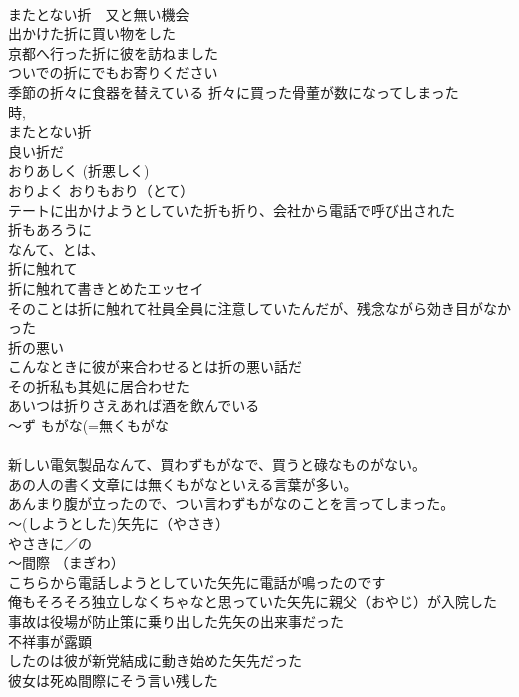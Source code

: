 \documentclass[8pt]{extreport}
\begin{document}
\begin{CJK}{UTF8}{min}
\\	またとない折　又と無い機会	
\\	出かけた折に買い物をした 
\\	京都へ行った折に彼を訪ねました 
\\	ついでの折にでもお寄りください 
\\	季節の折々に食器を替えている 折々に買った骨董が数になってしまった	
\\	時, 
\\	またとない折 
\\	良い折だ 
\\	おりあしく (折悪しく) 
\\	おりよく おりもおり（とて） 
\\	テートに出かけようとしていた折も折り、会社から電話で呼び出された 
\\	折もあろうに 
\\	なんて、とは、
\\	折に触れて 
\\	折に触れて書きとめたエッセイ 
\\	そのことは折に触れて社員全員に注意していたんだが、残念ながら効き目がなかった 
\\	折の悪い 
\\	こんなときに彼が来合わせるとは折の悪い話だ 
\\	その折私も其処に居合わせた 
\\	あいつは折りさえあれば酒を飲んでいる 
\\	～ず もがな(=無くもがな 
\\	[ずもがな] 
\\	新しい電気製品なんて、買わずもがなで、買うと碌なものがない。 
\\	あの人の書く文章には無くもがなといえる言葉が多い。
\\	あんまり腹が立ったので、つい言わずもがなのことを言ってしまった。 
\\	～(しようとした)矢先に（やさき） 
\\	やさきに／の 
\\	～間際 （まぎわ）	
\\	こちらから電話しようとしていた矢先に電話が鳴ったのです 
\\	俺もそろそろ独立しなくちゃなと思っていた矢先に親父（おやじ）が入院した 
\\	事故は役場が防止策に乗り出した先矢の出来事だった
\\	不祥事が露顕
\\	したのは彼が新党結成に動き始めた矢先だった 
\\	彼女は死ぬ間際にそう言い残した 

\end{CJK}
\end{document}
